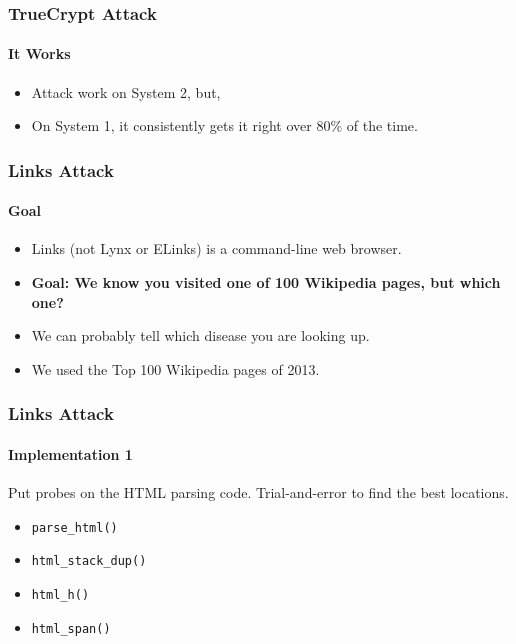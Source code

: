 \documentclass{beamer}
\begin{document}
\begin{frame}
    \frametitle{TrueCrypt Attack}
    \framesubtitle{It Works}


    \begin{itemize}
        \item Attack work on System 2, but,
        \item On System 1, it consistently gets it right over 80\% of the time.
    \end{itemize}

\end{frame}


\begin{frame}
    \frametitle{Links Attack}
    \framesubtitle{Goal}


    \begin{itemize}
        \item Links (not Lynx or ELinks) is a command-line web browser.
        \item \textbf{Goal: We know you visited one of 100 Wikipedia pages, but
        which one?}
        \item We can probably tell which disease you are looking up.
        \item We used the Top 100 Wikipedia pages of 2013.
    \end{itemize}
\end{frame}

\begin{frame}
    \frametitle{Links Attack}
    \framesubtitle{Implementation 1}

    Put probes on the HTML parsing code. Trial-and-error to find the best
    locations.

    \begin{itemize}
        \item \texttt{parse\_html()}
        \item \texttt{html\_stack\_dup()}
        \item \texttt{html\_h()}
        \item \texttt{html\_span()}
    \end{itemize}

\end{frame}
\end{document}
